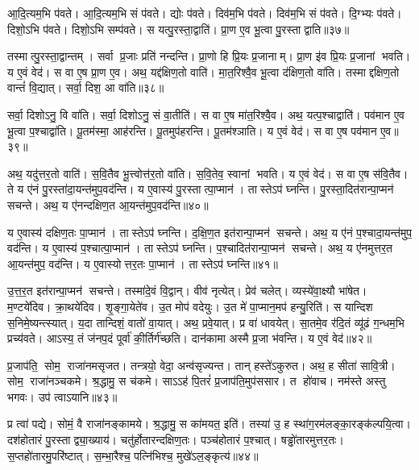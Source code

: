 आ॒दि॒त्यम॒भि प॑वते।
आ॒दि॒त्यम॒भि सं प॑वते।
द्योः प॑वते।
दिव॑म॒भि प॑वते।
दिव॑म॒भि सं प॑वते।
दि॒ग्भ्यः प॑वते।
दिशो॒ऽभि प॑वते।
दिशो॒ऽभि सम्प॑वते।
स यत्पु॒रस्ता॒द्वाति॑।
प्रा॒ण ए॒व भू॒त्वा पु॒रस्ताद्वाति॥३७॥

तस्मात्पु॒रस्ता॒द्वान्तम्।
सर्वा प्र॒जाः प्रति॑ नन्दन्ति।
प्रा॒णो हि प्रि॒यः प्र॒जानाम्।
प्रा॒ण इ॑व प्रि॒यः प्र॒जानां भवति।
य ए॒वं वेद॑।
स वा ए॒ष प्रा॒ण ए॒व।
अथ॒ यद्द॑क्षिण॒तो वाति॑।
मा॒त॒रिश्वै॒व भू॒त्वा द॑क्षिण॒तो वा॑ति।
तस्माद्दक्षिण॒तो वान्तं॑ वि॒द्यात्।
सर्वा॒ दिश॒ आ वा॑ति॥३८॥

सर्वा॒ दिशोऽनु॒ वि वा॑ति।
सर्वा॒ दिशोऽनु॒ सं वा॒तीति॑।
स वा ए॒ष मा॑त॒रिश्वै॒व।
अथ॒ यत्प॒श्चाद्वाति॑।
पव॑मान ए॒व भू॒त्वा प॒श्चाद्वा॑ति।
पू॒तम॑स्मा॒ आह॑रन्ति।
पू॒तमुप॑हरन्ति।
पू॒तम॑श्ञाति।
य ए॒वं वेद॑।
स वा ए॒ष पव॑मान ए॒व॥३९॥

अथ॒ यदु॑त्तर॒तो वाति॑।
स॒वि॒तैव भू॒त्त्वोत्त॑र॒तो वा॑ति।
स॒वि॒तेव॒ स्वानां भवति।
य ए॒वं वेद॑।
स वा ए॒ष स॑वि॒तैव।
ते य ए॑नं पु॒रस्ता॑दा॒यन्त॑मुप॒वद॑न्ति।
य ए॒वास्य॑ पु॒रस्तात्पा॒प्मान॑।
तास्तेऽप॑ घ्नन्ति।
पु॒रस्ता॒दित॑रान्पा॒प्मन॑ सचन्ते।
अथ॒ य ए॑नन्दक्षिण॒त आ॒यन्त॑मुप॒वद॑न्ति॥४०॥

य ए॒वास्य॑ दक्षिण॒तः पा॒प्मान॑।
तास्तेऽप॑ घ्नन्ति।
द॒क्षि॒ण॒त इत॑रान्पा॒प्मन॑ सचन्ते।
अथ॒ य ए॑नं प॒श्चादा॒यन्त॑मुप॒ वद॑न्ति।
य ए॒वास्य॑ प॒श्चात्पा॒प्मान॑।
तास्तेऽप॑ घ्नन्ति।
प॒श्चादित॑रान्पा॒प्मन॑ सचन्ते।
अथ॒ य ए॑नमुत्तर॒त आ॒यन्त॑मुप॒ वद॑न्ति।
य ए॒वास्योत्तर॒तः पा॒प्मान॑।
तास्तेऽप॑ घ्नन्ति॥४१॥

उ॒त्त॒र॒त इत॑रान्पा॒प्मन॑ सचन्ते।
तस्मा॑दे॒वं वि॒द्वान्।
वीव॑ नृत्येत्।
प्रेव॑ चलेत्।
व्यस्ये॑वा॒क्ष्यौ भा॑षेत।
म॒ण्टये॑दिव।
क्रा॒थये॑दिव।
शृ॒ङ्गा॒येते॑व।
उ॒त मोप॑ वदेयुः।
उ॒त मे॑ पा॒प्मान॒मप॑ हन्यु॒रिति॑।
स यान्दिश स॒निमे॒ष्यन्त्स्यात्।
य॒दा तान्दिशं॒ वातो॑ वा॒यात्।
अथ॒ प्रवे॒यात्।
प्र वा॑ धावयेत्।
सा॒तमे॒व र॑दि॒तं व्यू॑ढं ग॒न्धम॒भि प्रच्य॑वते।
आऽस्य॒ तं ज॑नप॒दं पूर्वा॑ की॒र्तिर्ग॑च्छति।
दान॑कामा अस्मै प्र॒जा भ॑वन्ति।
य ए॒वं वेद॑॥४२॥\anuvakamend[वेद॒ सं प॑वत आदि॒त्यात्प॑वते वा॒त्या वात्ये॒ष पव॑मान ए॒व द॑क्षिण॒त आ॒यन्त॑मुप॒ वद॑न्त्युत्तर॒तः पा॒प्मान॒स्ता स्तेप॑ घ्न॒न्तीत्य॒ष्टौ च॑]

प्र॒जाप॑ति॒ सोम॒ राजा॑नमसृजत।
तन्त्रयो॒ वेदा॒ अन्व॑सृज्यन्त।
तान् हस्ते॑ऽकुरुत।
अथ॒ ह सीता॑ सावि॒त्री।
सोम॒ राजा॑नञ्चकमे।
श्र॒द्धामु॒ स च॑कमे।
साऽऽह॑ पि॒तरं॑ प्र॒जाप॑ति॒मुप॑ससार।
त हो॑वाच।
नम॑स्ते अस्तु भगवः।
उप॑ त्वाऽयानि॥४३॥

प्र त्वा॑ पद्ये।
सोमं॒ वै राजा॑नङ्कामये।
श्र॒द्धामु॒ स का॑मयत॒ इति॑।
तस्या॑ उ॒ ह स्था॑ग॒रम॑लङ्का॒रङ्क॑ल्पयि॒त्वा।
दश॑होतारं पु॒रस्ताद्व्या॒ख्याय॑।
चतु॑र्\mbox{}होतारन्दक्षिण॒तः।
पञ्च॑होतारं प॒श्चात्।
षड्ढो॑तारमुत्तर॒तः।
स॒प्तहो॑तारमु॒परि॑ष्टात्।
स॒म्भा॒रैश्च॒ पत्नि॑भिश्च॒ मुखे॑ऽल॒ङ्कृत्य॑॥४४॥

